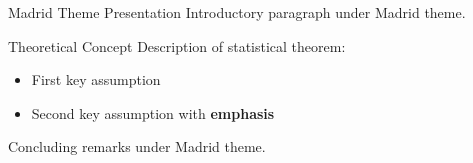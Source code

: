 \documentclass[14pt,t]{beamer-accessibility}
\begin{document}
\begin{frame}{Madrid Theme Presentation}
Introductory paragraph under Madrid theme.

\begin{block}{Theoretical Concept}
Description of statistical theorem:
\begin{itemize}
\item First key assumption
\item Second key assumption with \textbf{emphasis}
\end{itemize}
\end{block}

Concluding remarks under Madrid theme.
\end{frame}
\end{document}
